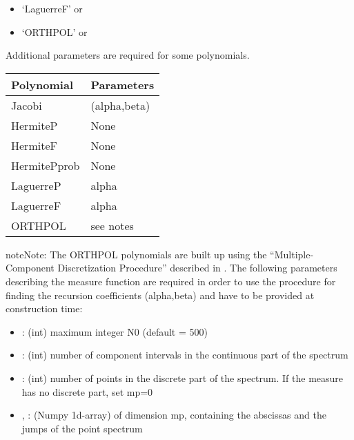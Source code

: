 \documentclass[letterpaper,10pt,english]{sphinxmanual}
\begin{document}
\begin{fulllineitems}
\begin{description}
\begin{itemize}
\item {} 
`LaguerreF' or 

\item {} 
`ORTHPOL' or 

\end{itemize}

Additional parameters are required for some polynomials.

\begin{tabulary}{\linewidth}{|L|L|}
\hline
\textsf{\relax 
Polynomial
} & \textsf{\relax 
Parameters
}\\
\hline
Jacobi
 & 
(alpha,beta)
\\

HermiteP
 & 
None
\\

HermiteF
 & 
None
\\

HermitePprob
 & 
None
\\

LaguerreP
 & 
alpha
\\

LaguerreF
 & 
alpha
\\

ORTHPOL
 & 
see notes
\\
\hline\end{tabulary}


\end{description}

\begin{notice}{note}{Note:}
The ORTHPOL polynomials are built up using the ``Multiple-Component Discretization Procedure'' described in \footnotemark[4]. The following parameters describing the measure function are required in order to use the procedure for finding the recursion coefficients (alpha,beta) and have to be provided at construction time:
\begin{itemize}
\item {} 
: (int) maximum integer N0 (default = 500)

\item {} 
: (int) number of component intervals in the continuous part of the spectrum

\item {} 
: (int) number of points in the discrete part of the spectrum. If the measure has no discrete part, set mp=0

\item {} 
, : (Numpy 1d-array) of dimension mp, containing the abscissas and the jumps of the point spectrum


\end{itemize}
\end{notice}
\end{fulllineitems}
\end{document}
